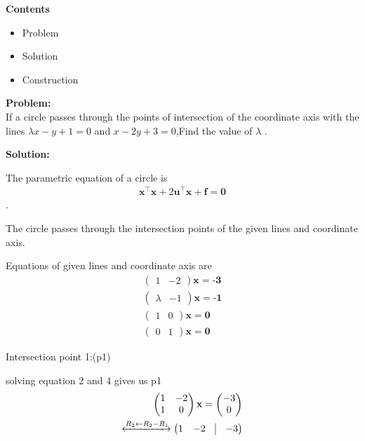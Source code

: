 \documentclass[8pt,a4paper]{report}
\newcommand{\myvec}[1]{\ensuremath{\begin{pmatrix}#1\end{pmatrix}}}
\let\vec\mathbf
\begin{document}
\begin{multicols}{2}


\raggedright \Large \textbf{Contents} \vspace{2mm}
\begin{itemize}
\raggedright \item Problem \item Solution\item Construction
\end{itemize}\vspace {5mm}
 

\raggedright \Large \textbf{Problem:} \vspace{2mm}
	\\  If a circle passes through the points of intersection of the coordinate axis with the lines $\lambda x-y+1=0$ and $x-2y+3=0$,Find the value of $\lambda$ .\vspace{4mm}
\\\raggedright\Large \textbf{Solution:} \vspace{2mm}
	\\ \raggedright The parametric equation of a circle is \begin{align} \vec{x^{\top}}\vec{x} + 2\vec{u^{\top}}\vec{x} + \textbf{f} = \textbf{0} \end{align} .\vspace{2mm}
	\\ \raggedright The circle passes through the intersection points of the given lines and coordinate axis.\vspace{2mm}
\\\raggedright Equations of given lines and coordinate axis are
                  \begin{align}
			   \myvec{1&-2}\vec{x} = \textbf{-3}
  		         \\  \myvec{\lambda&-1}\vec{x} = \textbf{-1}		
                           \\ \myvec{1&0}\vec{x} = \textbf{0}
			    \\\myvec{0&1}\vec{x} = \textbf{0}
                    \end{align}
   \raggedright Intersection point 1:(p1)
	    \\ \raggedright solving equation 2 and 4 gives us p1
              \begin{align*}
		      \myvec{1&-2\\1&0}\vec{x} = \myvec{-3\\0}
                      \\ \xleftrightarrow[]{R_2 \leftarrow R_2 -R_1 }
			    \myvec{
				    1 & -2 & \vrule & -3
}
\end{align*}
\end{multicols}
\end{document}
